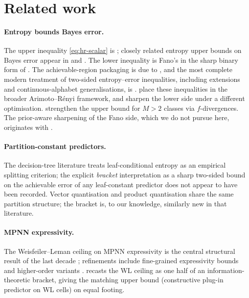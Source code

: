 \documentclass[10pt]{article}
\theoremstyle{definition}
\theoremstyle{remark}
\begin{document}
\section{Related work}\label{sec:related}

\paragraph{Entropy bounds Bayes error.} The upper inequality
\eqref{eq:hr-scalar} is \citet{hellmanraviv1970}; closely related
entropy upper bounds on Bayes error appear in
\citet{tebbe1968uncertainty} and \citet{kovalevskij1968}. The
lower inequality is Fano's \citep{fano1961} in the sharp binary
form of \citet[Thm.\ 2.10.1]{cover2006eit}. The achievable-region
packaging is due to \citet{feder1994}, and the most complete
modern treatment of two-sided entropy--error inequalities,
including extensions and continuous-alphabet generalisations, is
\citet{ho2010interplay}. \citet{sason2018arimoto} place these
inequalities in the broader Arimoto--R\'enyi framework, and
\citet{santhi2006agnostic} sharpen the lower side under a
different optimisation. \citet{hashlamoun1994} strengthen the
upper bound for $M > 2$ classes via $f$-divergences. The
prior-aware sharpening of the Fano side, which we do not pursue
here, originates with \citet[eq.\ 6]{hanverdu1994}.

\paragraph{Partition-constant predictors.} The decision-tree
literature \citep{breiman1984cart} treats leaf-conditional
entropy as an empirical splitting criterion; the explicit
\emph{bracket} interpretation as a sharp two-sided bound on the
achievable error of any leaf-constant predictor does not appear
to have been recorded. Vector quantisation
\citep{gersho1991vq,jegou2011pq} and product quantisation share
the same partition structure; the bracket is, to our knowledge,
similarly new in that literature.

\paragraph{MPNN expressivity.} The Weisfeiler--Leman ceiling on
MPNN expressivity is the central structural result of the
last decade \citep{xu2019gin,morris2019wl}; refinements include
fine-grained expressivity bounds \citep{boker2024finegrained}
and higher-order variants \citep{morris2020kwl}. 
recasts the WL ceiling as one half of an information-theoretic
bracket, giving the matching upper bound (constructive
plug-in predictor on WL cells) on equal footing.
\end{document}
